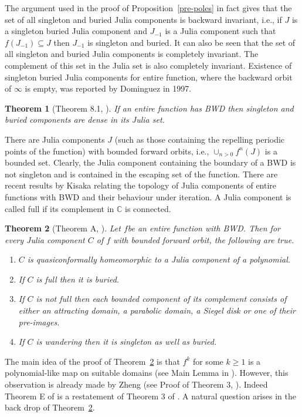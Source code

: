 \documentclass[11pt,a4paper]{article}
\newtheorem{theorem}{Theorem}[section]
\begin{document}
The argument used in the proof of Proposition~\ref{pre-poles} in fact gives that the set of all singleton and buried Julia components is backward invariant, i.e., if $J$ is a singleton buried Julia component and $J_{-1}$ is a Julia component such that $f(J_{-1}) \subseteq J$ then $J_{-1}$ is singleton and buried. It can also be seen that the set of all singleton and buried Julia components is completely invariant. The complement of this set in the Julia set is also completely invariant. Existence of singleton buried Julia components for entire function, where the backward orbit of $\infty$ is empty, was reported by Dominguez in 1997.
 	\begin{theorem}[Theorem 8.1, \cite{Dominguez 1997}]
 		If an entire function has BWD then singleton and buried components are dense in its Julia set.  
 	\end{theorem}
 There are Julia components $J$ (such as those containing the repelling periodic points of the function) with bounded forward orbits, i.e., $\cup_{n>0} f^n(J)$ is a bounded set.  Clearly, the Julia component  containing the boundary of a BWD is not singleton and is contained in the escaping set of the function.
 	There are recent results by Kisaka relating the topology of Julia components of entire functions with BWD and their behaviour under iteration. A Julia component is called full if its complement in $\mathbb{C}$ is connected. 
 	\begin{theorem}[Theorem A, \cite{Kisaka2025}]
 		Let $f$be  an entire function with BWD. Then for every Julia component $C$ of $f$ with bounded forward orbit, the following are true.
 		\begin{enumerate}
 			\item  $C$ is quasiconformally homeomorphic to a Julia component of a polynomial.
 			\item If $C$ is full then it is buried.
 			\item If $C$ is not full then each bounded component of its complement consists of either an attracting domain, a parabolic domain, a Siegel disk or one of their pre-images.
 			\item If $C$ is wandering then it is singleton as well as buried.
 		\end{enumerate}
 		
 		\label{Kisaka2025} 		
 	\end{theorem}
 	The main idea of the proof of Theorem~\ref{Kisaka2025} is that $f^k$ for some $k \geq 1$ is a polynomial-like map on suitable domains (see Main Lemma in \cite{Kisaka2025}). However, this observation is already made by Zheng (see Proof of Theorem 3, \cite{Zheng 2000}). Indeed Theorem E of \cite{Kisaka2025} is a restatement of Theorem 3 of \cite{Zheng 2000}.   A natural question arises in the back drop of Theorem~\ref{Kisaka2025}.
\end{document}
